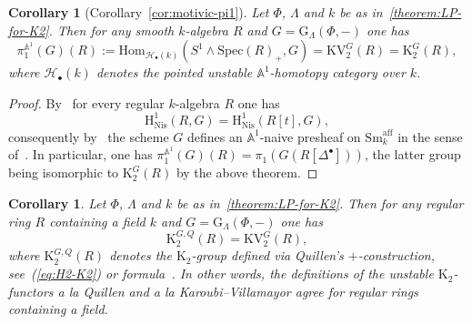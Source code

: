 \documentclass[oneside, 11pt]{amsart}
\numberwithin{equation}{section}
\newtheorem{corollary}[lemma]{Corollary}
\newcommand{\K}{{\mathrm{K}}}
\theoremstyle{definition}
\theoremstyle{definition}
\theoremstyle{remark}
\begin{document}
\begin{corollary}[Corollary~\ref{cor:motivic-pi1}] \label{cor:motivic-pi1-2} Let $\Phi$, $\Lambda$ and $k$ be as in~\cref{theorem:LP-for-K2}. Then for any smooth $k$-algebra $R$ and $G = \mathrm{G}_{\Lambda}(\Phi, -)$ one has
\[ \pi_1^{\mathbb{A}^1}(G)(R) := \mathrm{Hom}_{\mathscr{H}_{\bullet}(k)}(S^1 \wedge \mathrm{Spec}(R)_+, G) = \mathrm{KV}_2^{G}(R) = \K_2^G(R),\]
where $\mathscr{H}_\bullet(k)$ denotes the pointed unstable $\mathbb{A}^1$-homotopy category over $k$.
\end{corollary}
\begin{proof}
 By~\cite[Corollary~5.4]{Sta20} for every regular $k$-algebra $R$ one has \[\mathrm H^1_\mathrm{Nis}(R, G) = \mathrm H^1_\mathrm{Nis}(R[t], G),\] consequently by~\cite[Theorem~2.4.2]{AHW18} the scheme $G$ defines an $\mathbb{A}^1$-naive presheaf on $\mathrm{Sm}_{k}^{\mathrm{aff}}$ in the sense of~\cite[Definition~2.1.1]{AHW18}.
 In particular, one has $\pi_1^{\mathbb{A}^1}(G)(R) = \pi_1(G(R[\Delta^\bullet]))$, the latter group being isomorphic to $\K_2^G(R)$ by the above theorem.
\end{proof} 

\begin{corollary}
\label{cor:+=A1}
Let $\Phi$, $\Lambda$ and $k$ be as in~\cref{theorem:LP-for-K2}. Then for any regular ring $R$ containing a field $k$ and $G = \mathrm{G}_{\Lambda}(\Phi, -)$ one has
$$
\K_{2}^{G,Q}(R) = \mathrm{KV}_2^G(R),
$$
where $\K_2^{G, Q}(R)$ denotes the $\mathrm K_2$-group defined via Quillen's $+$-construction, see~(\ref{eq:H2-K2}) or formula~\cite[(2.21)]{LS20}. In other words, the definitions of the unstable $\K_2$-functors a la Quillen and a la Karoubi--Villamayor agree for regular rings containing a field.
\end{corollary}

 
 
 
 
 
 
 
 
 
 
 
 
 
 
 
 
 
 
\end{document}

